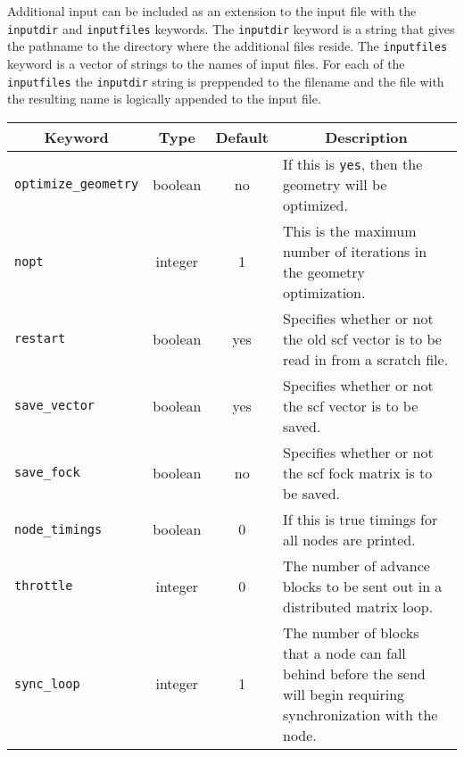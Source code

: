 Additional input can be included as
an extension to the input file with the {\tt inputdir}
and {\tt inputfiles} keywords.   The {\tt inputdir} keyword is a string
that gives the pathname to the directory where the additional files
reside.  The {\tt inputfiles}
keyword is a vector of strings to the names of input files.  For each
of the {\tt inputfiles} the {\tt inputdir} string is preppended to
the filename and the file with the resulting name is logically appended to
the input file.

\begin{table}
\centering
\begin{tabular}{|lccp{2.75in}|}
\hline
\multicolumn{1}{|c}{Keyword} & \multicolumn{1}{c}{Type} &
  \multicolumn{1}{c}{Default} & \multicolumn{1}{c|}{Description} \\
\hline
  {\tt optimize\_geometry}&boolean& no & If this is {\tt yes}, then
                                         the geometry will be optimized. \\
  {\tt nopt}              &integer&  1 & This is the maximum number
                                         of iterations in the geometry
                                         optimization. \\
  {\tt restart}           &boolean&yes & Specifies whether or not the
                                         old scf vector is to be read in from a
                                         scratch file. \\
  {\tt save\_vector}      &boolean&yes & Specifies whether or not the scf
                                         vector is to be saved. \\
  {\tt save\_fock}        &boolean& no & Specifies whether or not the scf
                                         fock matrix is to be saved. \\
  {\tt node\_timings}     &boolean&  0 & If this is true timings for all
                                         nodes are printed. \\
  {\tt throttle}          &integer&  0 & The number of advance blocks to
                                         be sent out in a distributed
                                         matrix loop. \\
  {\tt sync\_loop}        &integer&  1 & The number of blocks that a node
                                         can fall behind before the send
                                         will begin
                                         requiring synchronization with
                                         the node. \\

\end{tabular}
\end{table}
